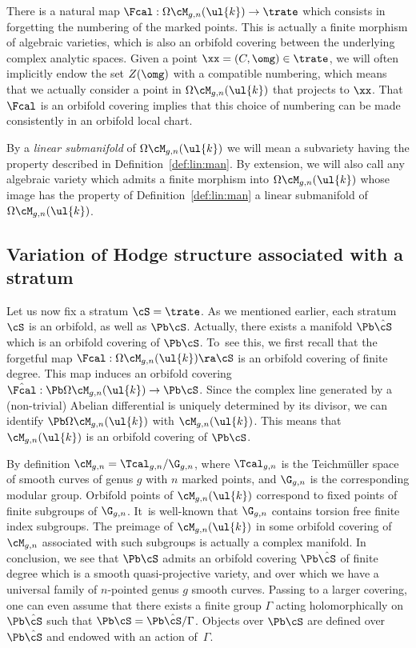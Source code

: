 There is a natural map $\Fcal: \Omega\cM_{g,n}(\ul{k}) \to \trate$ which consists in forgetting the numbering of the marked points.
This is actually a finite morphism of algebraic varieties, which is also an orbifold covering between the underlying complex analytic spaces.
Given a point $\xx=(C,\omg) \in \trate$, we will often implicitly endow the set $Z(\omg)$ with a compatible numbering, which means that we actually consider a point in $\Omega\cM_{g,n}(\ul{k})$ that projects to $\xx$.
That $\Fcal$ is an orbifold covering implies that this choice of numbering can be made consistently in an orbifold local chart.

By a \emph{linear submanifold} of $\Omega\cM_{g,n}(\ul{k})$ we will mean a subvariety having the property described in Definition~\ref{def:lin:man}.
By extension, we will also call any algebraic variety which admits a finite morphism into $\Omega\cM_{g,n}(\ul{k})$ whose image has the property of Definition~\ref{def:lin:man} a linear submanifold of $\Omega\cM_{g,n}(\ul{k})$.\enlargethispage{.5\baselineskip}%

\subsection{Variation of Hodge structure associated with a stratum}\label{subsec:VMHS}
Let us now fix a stratum $\cS=\trate$. As we mentioned earlier, each stratum $\cS$ is an orbifold, as well as $\Pb\cS$. Actually, there exists a manifold $\Pb\hat\cS$ which is an orbifold covering of $\Pb\cS$.
To~see this, we first recall that the forgetful map $\Fcal: \Omega\cM_{g,n}(\ul{k}) \ra\nobreak \cS$ is an orbifold covering of finite degree. This map induces an orbifold covering $\hat{\Fcal}: \Pb\Omega\cM_{g,n}(\ul{k}) \to \Pb\cS$. Since the complex line generated by a (non-trivial) Abelian differential is uniquely determined by its divisor, we can identify $\Pb\Omega\cM_{g,n}(\ul{k})$ with $\cM_{g,n}(\ul{k})$. This means that $\cM_{g,n}(\ul{k})$ is an orbifold covering of $\Pb\cS$.

By definition $\cM_{g,n}=\Tcal_{g,n}/\G_{g,n}$, where $\Tcal_{g,n}$ is the Teichmüller space of smooth curves of genus $g$ with $n$ marked points, and $\G_{g,n}$ is the corresponding modular group. Orbifold points of $\cM_{g,n}(\ul{k})$ correspond to fixed points of finite subgroups of $\G_{g,n}$. It~is well-known that $\G_{g,n}$ contains torsion free finite index subgroups. The preimage of $\cM_{g,n}(\ul{k})$ in some orbifold covering of $\cM_{g,n}$ associated with such subgroups is actually a complex manifold. In conclusion, we see that $\Pb\cS$ admits an orbifold covering $\Pb\hat{\cS}$ of finite degree which is a smooth quasi-projective variety, and over which we have a universal family of $n$-pointed genus $g$ smooth curves.
Passing to a larger covering, one can even assume that there exists a finite group $\Gamma$ acting holomorphically on $\Pb\hat\cS$ such that $\Pb\cS=\Pb\hat\cS/\Gamma$.
Objects over $\Pb\cS$ are defined over $\Pb\hat\cS$ and endowed with an action of~$\Gamma$.

